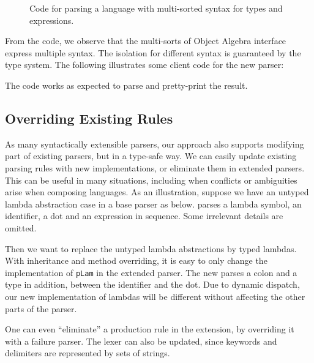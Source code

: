 \begin{figure}[ht]
\caption{Code for parsing a language with multi-sorted syntax for types and expressions.}
\label{fig:multi}
\end{figure}

From the code, we observe that the multi-sorts of Object Algebra interface
express multiple syntax. The isolation for different syntax
is guaranteed by the type system. The following illustrates some client code
for the new parser:

The code works as expected to parse and pretty-print the result.

\subsection{Overriding Existing Rules}\label{subsec:overriding-rules}

As many syntactically extensible parsers, our approach also supports
modifying part of existing parsers, but in a type-safe way. We can
easily update existing parsing rules with new implementations, or
eliminate them in extended parsers. This can be useful in many
situations, including when conflicts or ambiguities arise when
composing languages.
As an illustration, suppose we have an untyped lambda abstraction case in a base parser as below.  parses a lambda symbol, an identifier, a dot and an expression in sequence. Some irrelevant details are omitted.


Then we want to replace the untyped lambda abstractions by typed
lambdas. With inheritance and method overriding, it is easy to only
change the implementation of \lstinline{pLam} in the extended parser.
The new  parses a colon and a type in addition,
between the identifier and the dot. Due to dynamic dispatch, our new
implementation of lambdas will be different without affecting the other parts of the parser.



One can even ``eliminate'' a production rule in the extension, by overriding it with a failure parser. The lexer can also be updated, since keywords and delimiters are represented by sets of strings.

